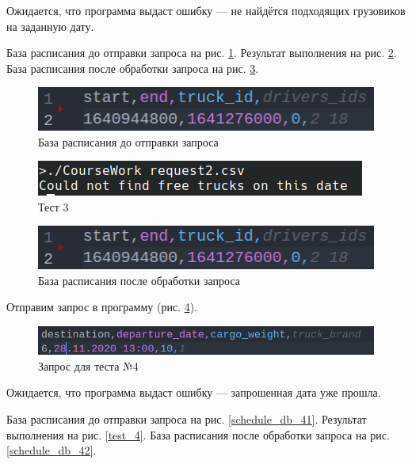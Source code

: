 Ожидается, что программа выдаст ошибку --- 
не найдётся подходящих грузовиков на заданную дату.

База расписания до отправки запроса на рис. \ref{schedule_db_31}.
Результат выполнения на рис. \ref{test_3}.
База расписания после обработки запроса на рис. \ref{schedule_db_32}.

\begin{figure}[H]
	\centering
	\includegraphics[width=0.7\linewidth]{photo/tests/user/schedule_db_test_1}
	\caption{База расписания до отправки запроса}
	\label{schedule_db_31}
\end{figure}

\begin{figure}[H]
	\centering
	\includegraphics[width=0.7\linewidth]{photo/tests/user/test_3}
	\caption{Тест 3}
	\label{test_3}
\end{figure}

\begin{figure}[H]
	\centering
	\includegraphics[width=0.7\linewidth]{photo/tests/user/schedule_db_test_1}
	\caption{База расписания после обработки запроса}
	\label{schedule_db_32}
\end{figure}

Отправим запрос в программу (рис. \ref{request_3}).

\begin{figure}[H]
	\centering
	\includegraphics[width=0.7\linewidth]{photo/tests/user/request_3}
	\caption{Запрос для теста №4}
	\label{request_3}
\end{figure}

Ожидается, что программа выдаст ошибку --- 
запрошенная дата уже прошла.

База расписания до отправки запроса на рис. \ref{schedule_db_41}.
Результат выполнения на рис. \ref{test_4}.
База расписания после обработки запроса на рис. \ref{schedule_db_42}.

